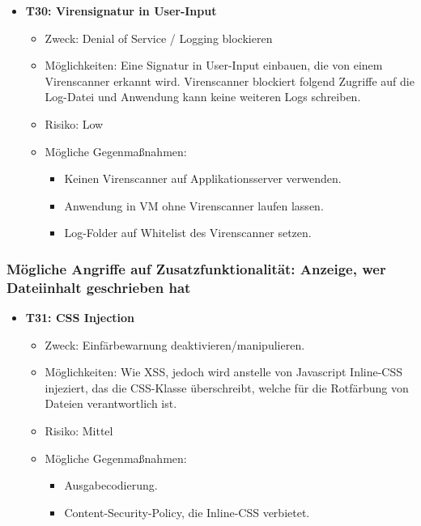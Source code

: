 \documentclass[12pt,DIV14,BCOR10mm,a4paper,parskip=half-,headsepline,headinclude,english,ngerman,bibliography=totocnumbered]{scrreprt}
\begin{document}
\begin{itemize}
  \hypertarget{threat30}{}
  \item \textbf{T30: Virensignatur in User-Input}
  \begin{itemize}
  \item Zweck: Denial of Service / Logging blockieren
  \item Möglichkeiten: Eine Signatur in User-Input einbauen, die von einem Virenscanner erkannt wird. Virenscanner blockiert folgend Zugriffe auf die Log-Datei und Anwendung kann keine weiteren Logs schreiben.
  \item Risiko: Low
  \item Mögliche Gegenmaßnahmen:
  \begin{itemize}
  	\item Keinen Virenscanner auf Applikationsserver verwenden.
  	\item Anwendung in VM ohne Virenscanner laufen lassen.
  	\item Log-Folder auf Whitelist des Virenscanner setzen.
  \end{itemize}
  \end{itemize}
\end{itemize}

\subsubsection{Mögliche Angriffe auf Zusatzfunktionalität: Anzeige, wer Dateiinhalt geschrieben hat}

\begin{itemize}

  \hypertarget{threat31}{}
  \item \textbf{T31: CSS Injection}
  \begin{itemize}
  \item Zweck: Einfärbewarnung deaktivieren/manipulieren.
  \item Möglichkeiten: Wie XSS, jedoch wird anstelle von Javascript Inline-CSS injeziert, das die CSS-Klasse überschreibt, welche für die Rotfärbung von Dateien verantwortlich ist.
  \item Risiko: Mittel
  \item Mögliche Gegenmaßnahmen:
  \begin{itemize}
	  \item Ausgabecodierung.
	  \item Content-Security-Policy, die Inline-CSS verbietet.
  \end{itemize}
\end{itemize}
\end{itemize}
\end{document}
